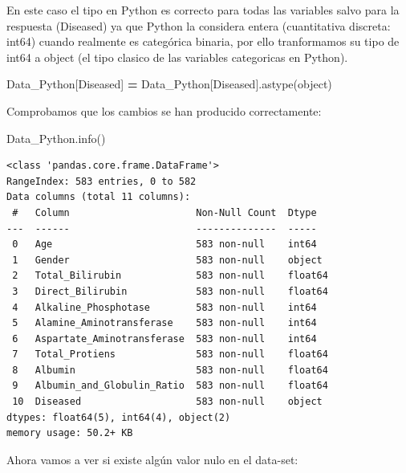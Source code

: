 \documentclass[
  11pt,
  a4paper,
]{article}
\newenvironment{Shaded}{\begin{snugshade}}{\end{snugshade}}
\newcommand{\NormalTok}[1]{#1}
\newcommand{\OperatorTok}[1]{\textcolor[rgb]{0.81,0.36,0.00}{\textbf{#1}}}
\newcommand{\StringTok}[1]{\textcolor[rgb]{0.31,0.60,0.02}{#1}}
\begin{document}
\vspace{0.5cm}

En este caso el tipo en Python es correcto para todas las variables
salvo para la respuesta (Diseased) ya que Python la considera entera
(cuantitativa discreta: int64) cuando realmente es categórica binaria,
por ello tranformamos su tipo de int64 a object (el tipo clasico de las
variables categoricas en Python).

\begin{Shaded}
\begin{Highlighting}[]
\NormalTok{Data\_Python[}\StringTok{\textquotesingle{}Diseased\textquotesingle{}}\NormalTok{] }\OperatorTok{=}\NormalTok{ Data\_Python[}\StringTok{\textquotesingle{}Diseased\textquotesingle{}}\NormalTok{].astype(}\StringTok{\textquotesingle{}object\textquotesingle{}}\NormalTok{)}
\end{Highlighting}
\end{Shaded}

Comprobamos que los cambios se han producido correctamente:

\begin{Shaded}
\begin{Highlighting}[]
\NormalTok{Data\_Python.info()}
\end{Highlighting}
\end{Shaded}

\begin{verbatim}
<class 'pandas.core.frame.DataFrame'>
RangeIndex: 583 entries, 0 to 582
Data columns (total 11 columns):
 #   Column                      Non-Null Count  Dtype  
---  ------                      --------------  -----  
 0   Age                         583 non-null    int64  
 1   Gender                      583 non-null    object 
 2   Total_Bilirubin             583 non-null    float64
 3   Direct_Bilirubin            583 non-null    float64
 4   Alkaline_Phosphotase        583 non-null    int64  
 5   Alamine_Aminotransferase    583 non-null    int64  
 6   Aspartate_Aminotransferase  583 non-null    int64  
 7   Total_Protiens              583 non-null    float64
 8   Albumin                     583 non-null    float64
 9   Albumin_and_Globulin_Ratio  583 non-null    float64
 10  Diseased                    583 non-null    object 
dtypes: float64(5), int64(4), object(2)
memory usage: 50.2+ KB
\end{verbatim}

\vspace{0.5cm}

Ahora vamos a ver si existe algún valor nulo en el data-set:
\end{document}
